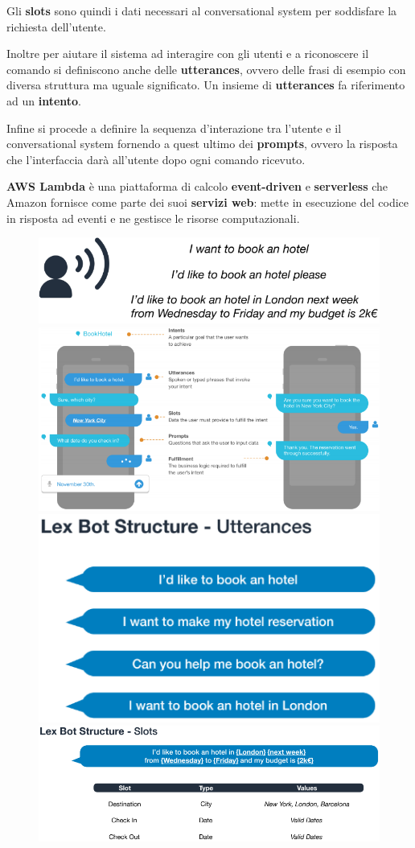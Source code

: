 Gli \textbf{slots} sono quindi i dati necessari al conversational system per soddisfare la richiesta dell'utente.

Inoltre per aiutare il sistema ad interagire con gli utenti e a riconoscere il comando si definiscono anche delle \textbf{utterances}, ovvero delle frasi di esempio con diversa struttura ma uguale significato. Un insieme di \textbf{utterances} fa riferimento ad un \textbf{intento}.

Infine si procede a definire la sequenza d'interazione tra l'utente e il conversational system  fornendo a quest ultimo dei \textbf{prompts}, ovvero la risposta che l'interfaccia darà all'utente dopo ogni comando ricevuto.

\pagebreak

\textbf{AWS Lambda} è una piattaforma di calcolo \textbf{event-driven} e \textbf{serverless} che Amazon fornisce come parte dei suoi \textbf{servizi web}: mette in esecuzione del codice in risposta ad eventi e ne gestisce le risorse computazionali.

\begin{figure}[!h]
	\centering
	\includegraphics[scale=0.55]{../immagini/Lex_general3.png}
	\includegraphics[scale=0.65]{../immagini/Lex_general.png}
	\includegraphics[scale=0.6]{../immagini/Lex_general1.png}
	\includegraphics[scale=0.5]{../immagini/Lex_general2.png}
\end{figure}
